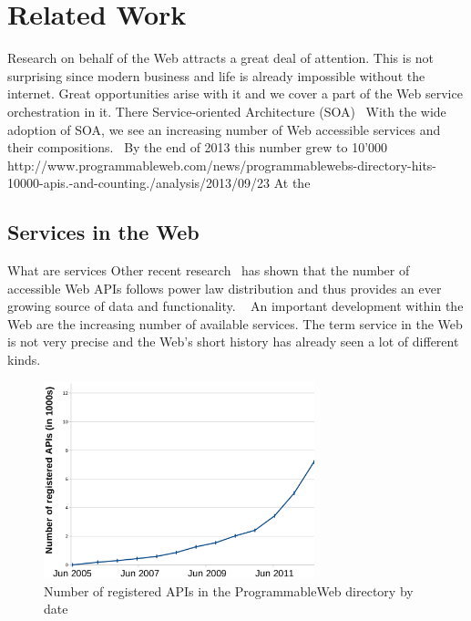 
\chapter{Related Work}

Research on behalf of the Web attracts a great deal of attention.
This is not surprising since modern business and life is already impossible without the internet.
Great opportunities arise with it and we cover a part of the Web service orchestration in it.
There 
Service-oriented Architecture (\textrm{SOA})~\cite{perrey2003service}
With the wide adoption of SOA, we see an increasing number of Web accessible services and their compositions.~\cite{conf/icws/HuangFT12}
By the end of 2013 this number grew to 10'000 http://www.programmableweb.com/news/programmablewebs-directory-hits-10000-apis.-and-counting./analysis/2013/09/23
At the 
\section{Services in the Web}
What are services
Other recent research~\cite{conf/icws/HuangFT12} has shown that the number of accessible Web APIs follows power law distribution and thus provides an ever growing source of data and functionality.
~\cite{peltz2003web}
An important development within the Web are the increasing number of available services.
The term service in the Web is not very precise and the Web's short history has already seen a lot of different kinds.

\begin{figure}[!ht]
  \centering
  \includegraphics[width=0.7\textwidth]{figures/NumOfAPIs}
  \caption{Number of registered APIs in the ProgrammableWeb directory by date}
  \label{fig:NumOfAPIs}
\end{figure}



